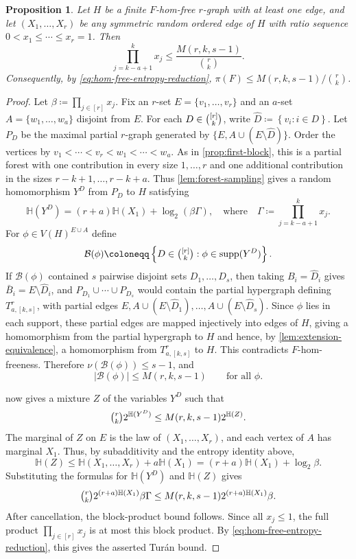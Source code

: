 \documentclass[10pt,a4paper]{article}
\theoremstyle{plain}
\newtheorem{proposition}[proposition]{Proposition}
\theoremstyle{definition}
\theoremstyle{plain}
\DeclareMathOperator{\supp}{supp}
\newcommand{\calB}{\mathcal B}
\newcommand{\HH}{\mathbb H}
\begin{document}
\begin{proposition}\label{prop:matching-block}
Let $H$ be a finite $F$-hom-free $r$-graph with at least one edge, and let $(X_1,\ldots,X_r)$ be any symmetric random ordered edge of $H$ with ratio sequence $0<x_1\le\cdots\le x_r=1$.  Then
\[
        \prod_{j=k-a+1}^{k}x_j
        \le\frac{M(r,k,s-1)}{\binom{r}{k}}.
\]
Consequently, by \cref{eq:hom-free-entropy-reduction}, $\pi(F)\le {M(r,k,s-1)}/{\binom{r}{k}}$. 
\end{proposition}

\begin{proof}
Let $\beta\coloneqq\prod_{j\in [r]} x_j$.  Fix an $r$-set $E=\{v_1,\ldots,v_r\}$ and an $a$-set $A=\{w_1,\ldots,w_a\}$ disjoint from $E$.  For each $D\in\tbinom{[r]}{k}$, write $\hat{D}\coloneqq\left\{v_i:i\in D\right\}$.  Let $P_D$ be the maximal partial $r$-graph generated by $\{E, A\cup(E\setminus\hat{D})\}$. 
Order the vertices by $v_1<\cdots<v_r<w_1<\cdots<w_a$.  As in \cref{prop:first-block}, this is a partial forest with one contribution in every size $1,\ldots,r$ and one additional contribution in the sizes $r-k+1,\ldots,r-k+a$.  Thus \cref{lem:forest-sampling} gives a random homomorphism $Y^D$ from $P_D$ to $H$ satisfying
\[
        \HH(Y^D)=(r+a)\HH(X_1)+\log_2(\beta\Gamma), 
        \quad\text{where}\quad
        \Gamma\coloneqq\prod_{j=k-a+1}^{k}x_j.
\]
For $\phi\in V(H)^{E\cup A}$ define
\[
        \calB(\phi)\coloneqq\left\{D\in\tbinom{[r]}{k}:\phi\in\supp(Y^D)\right\}.
\]
If $\calB(\phi)$ contained $s$ pairwise disjoint sets $D_1,\ldots,D_s$, then taking $B_i=\hat{D}_i$ gives $\bar B_i=E\setminus\hat{D}_i$, and $P_{D_1}\cup\cdots\cup P_{D_s}$ would contain the partial hypergraph defining $T^r_{a,[k,s]}$, with partial edges $E,A\cup(E\setminus\hat{D}_1),\ldots,A\cup(E\setminus\hat{D}_s)$.  Since $\phi$ lies in each support, these partial edges are mapped injectively into edges of $H$, giving a homomorphism from the partial hypergraph to $H$ and hence, by \cref{lem:extension-equivalence}, a homomorphism from $T^r_{a,[k,s]}$ to $H$.  This contradicts $F$-hom-freeness.  Therefore $\nu(\calB(\phi))\le s-1$, and
\[
        |\calB(\phi)|\le M(r,k,s-1)
        \qquad\text{for all }\phi.
\]

 now gives a mixture $Z$ of the variables $Y^D$ such that
\[
        \tbinom{r}{k} 2^{\HH(Y^D)}\le M(r,k,s-1)2^{\HH(Z)}.
\]
The marginal of $Z$ on $E$ is the law of $(X_1,\ldots,X_r)$, and each vertex of $A$ has marginal $X_1$.  Thus, by subadditivity and the entropy identity above,
\[
        \HH(Z)\le \HH(X_1,\ldots,X_r)+a\HH(X_1)
        =(r+a)\HH(X_1)+\log_2\beta.
\]
Substituting the formulas for $\HH(Y^D)$ and $\HH(Z)$ gives
\[
        \tbinom{r}{k} 2^{(r+a)\HH(X_1)}\beta\Gamma
        \le
        M(r,k,s-1)2^{(r+a)\HH(X_1)}\beta.
\]
After cancellation, the block-product bound follows.  Since all $x_j\le1$, the full product $\prod_{j\in [r]} x_j$ is at most this block product.  By \cref{eq:hom-free-entropy-reduction}, this gives the asserted Tur\'an bound.
\end{proof}
\end{document}
